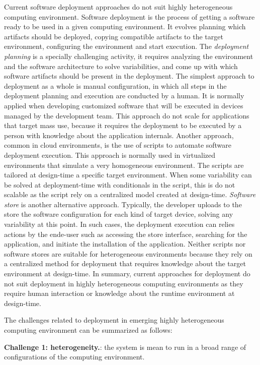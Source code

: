 Current software deployment approaches do not suit highly heterogeneous computing environment. Software deployment is the process of getting a software ready to be used in a given computing environment\cite{carzaniga_characterization_1998}. It evolves planning which artifacts should be deployed, copying compatible artifacts to the target environment, configuring the environment and start execution. The \emph{deployment planning} is a specially challenging activity, it requires analyzing the environment and the software architecture to solve variabilities, and come up with which software artifacts should be present in the deployment.
The simplest approach to deployment as a whole is manual configuration, in which all steps in the deployment planning and execution are conducted by a human. It is normally applied when developing customized software that will be executed in devices managed by the development team. This approach do not scale for applications that target mass use, because it requires the deployment to be executed by a person with knowledge about the application internals.
Another approach, common in cloud environments, is the use of scripts to automate software deployment execution. This approach is normally used in virtualized environments that simulate a very homogeneous environment. The scripts are tailored at design-time a specific target environment. When some variability can be solved at deployment-time with conditionals in the script, this is do not scalable as the script rely on a centralized model created at design-time.
\emph{Software store} is another alternative approach. Typically, the developer uploads to the store the software configuration for each kind of target device, solving any variability at this point.
In such cases, the deployment execution can relies actions by the ende-user such as accessing the store interface, searching for the application, and initiate the installation of the application.
Neither scripts nor software stores are suitable for heterogeneous environments because they rely on a centralized method for deployment that requires knowledge about the target environment at design-time. In summary, current approaches for deployment do not suit deployment in highly heterogeneous computing environments as they require human interaction or knowledge about the runtime environment at design-time.

The challenges related to deployment in emerging highly heterogeneous computing environment can be summarized as follows:

\textbf{ Challenge 1: heterogeneity.}: the system is mean to run in a broad range of configurations of the computing environment.

